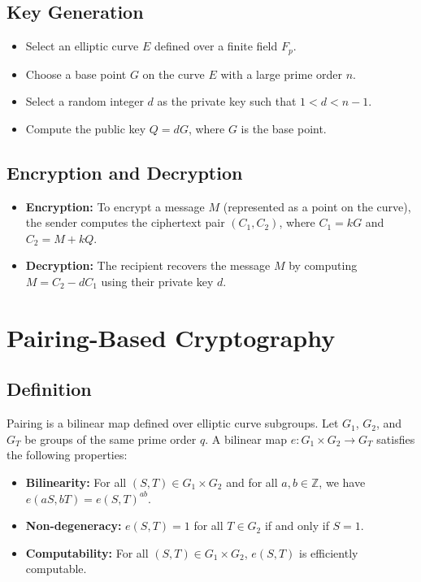 \documentclass[12pt]{report}
\numberwithin{equation}{chapter}
\begin{document}
\subsection{Key Generation}
\begin{itemize}
    \item Select an elliptic curve \( E \) defined over a finite field \( F_p \).
    \item Choose a base point \( G \) on the curve \( E \) with a large prime order \( n \).
    \item Select a random integer \( d \) as the private key such that \( 1 < d < n - 1 \).
    \item Compute the public key \( Q = dG \), where \( G \) is the base point.
\end{itemize}

\subsection{Encryption and Decryption}
\begin{itemize}
    \item \textbf{Encryption:} To encrypt a message \( M \) (represented as a point on the curve), the sender computes the ciphertext pair \( (C_1, C_2) \), where \( C_1 = kG \) and \( C_2 = M + kQ \).
    \item \textbf{Decryption:} The recipient recovers the message \( M \) by computing \( M = C_2 - dC_1 \) using their private key \( d \).
\end{itemize}

\section{Pairing-Based Cryptography}

\subsection*{Definition}
Pairing is a bilinear map defined over elliptic curve subgroups. Let \( G_1 \), \( G_2 \), and \( G_T \) be groups of the same prime order \( q \). A bilinear map \( e: G_1 \times G_2 \to G_T \) satisfies the following properties:
\begin{itemize}
    \item \textbf{Bilinearity:} For all \( (S, T) \in G_1 \times G_2 \) and for all \( a, b \in \mathbb{Z} \), we have \( e(aS, bT) = e(S, T)^{ab} \).
    \item \textbf{Non-degeneracy:} \( e(S, T) = 1 \) for all \( T \in G_2 \) if and only if \( S = 1 \).
    \item \textbf{Computability:} For all \( (S, T) \in G_1 \times G_2 \), \( e(S, T) \) is efficiently computable.
\end{itemize}
\end{document}
